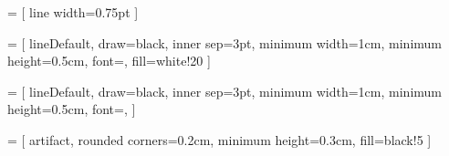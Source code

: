 \newcommand{\hide}[1]{}



\newcommand{\gustavo}[1]{\todo[inline,color=cyan!30]{{\footnotesize Gustavo: #1}}}
\newcommand{\tobias}[1]{\todo[inline,color=orange!30]{{\footnotesize Tobias: #1}}}
\newcommand{\ebj}[1]{\todo[inline,color=red!30]{{\footnotesize Einar: #1}}}
\newcommand{\carlos}[1]{\todo[inline,color=green!30]{{\footnotesize Carlos: #1}}}
\newcommand{\francisco}[1]{\todo[inline,color=magenta!30]{{\footnotesize Francisco: #1}}}

\newcommand\red[1]{{\color{red}#1}}

\newcommand{\RQ}[1]{\textbf{RQ#1}}

\newcommand\owltopddl{Owl2PDDL\xspace}
\newcommand\planta{PLANTA\xspace}
\newcommand{\CamaraApproach}{\textsc{Camara}\xspace}
\newcommand\plansys{PlanSys2\xspace}
\newcommand\tomasys{TOMASys\xspace}
\newcommand\pddltomasys{PDDL-TOMASys\xspace}

\newcommand{\Uone}{\emph{U1}\xspace}
\newcommand{\Utwo}{\emph{U2}\xspace}
\newcommand{\Uthree}{\emph{U3}\xspace}

\newcommand{\Sone}{\emph{S1}\xspace}
\newcommand{\Stwo}{\emph{S2}\xspace}
\newcommand{\Sthree}{\emph{S3}\xspace}
\newcommand{\Sfour}{\emph{S4}\xspace}
\newcommand{\Sfive}{\emph{S5}\xspace}


\newcommand{\greenColor}{OliveGreen} 	%
\newcommand{\blueColor}{MidnightBlue}	%
\newcommand{\redColor}{BrickRed}
\newcommand{\purpleColor}{Purple}
\newcommand{\orangeColor}{Orange}

 = [
    line width=0.75pt
]

 = [
lineDefault,
draw=black,
inner sep=3pt,
minimum width=1cm,
minimum height=0.5cm,
font=\sffamily,
fill=white!20
]

 = [
lineDefault,
draw=black,
inner sep=3pt,
minimum width=1cm,
minimum height=0.5cm,
font=\sffamily,
]

 = [
artifact,
rounded corners=0.2cm,
minimum height=0.3cm,
fill=black!5
]


